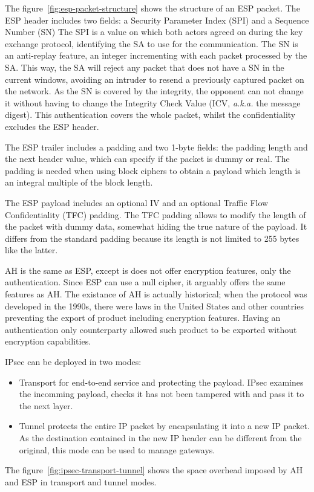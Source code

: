 The figure~\ref{fig:esp-packet-structure} shows the structure of an ESP packet.
The ESP header includes two fields: a Security Parameter Index (SPI) and a Sequence Number (SN)
The SPI is a value on which both actors agreed on during the key exchange protocol, identifying the SA to use for the communication.
The SN is an anti-replay feature, an integer incrementing with each packet processed by the SA. This way, the SA will reject any packet that does not have a SN in the current windows, avoiding an intruder to resend a previously captured packet on the network.
As the SN is covered by the integrity, the opponent can not change it without having to change the Integrity Check Value (ICV, \textit{a.k.a.} the message digest).
This authentication covers the whole packet, whilst the confidentiality excludes the ESP header.

\noindent The ESP trailer includes a padding and two 1-byte fields: the padding length and the next header value, which can specify if the packet is dummy or real.
The padding is needed when using block ciphers to obtain a payload which length is an integral multiple of the block length.

\noindent The ESP payload includes an optional IV and an optional Traffic Flow Confidentiality (TFC) padding.
The TFC padding allows to modify the length of the packet with dummy data, somewhat hiding the true nature of the payload.
It differs from the standard padding because its length is not limited to 255 bytes like the latter.

\noindent AH is the same as ESP, except is does not offer encryption features, only the authentication.
Since ESP can use a null cipher, it arguably offers the same features as AH.
The existance of AH is actually historical; when the protocol was developed in the 1990s, there were laws in the United States and other countries preventing the export of product including encryption features.
Having an authentication only counterparty allowed such product to be exported without encryption capabilities.\newline{}

IPsec can be deployed in two modes: 
\begin{itemize}
	\item Transport for end-to-end service and protecting the payload. IPsec examines the incomming payload, checks it has not been tampered with and pass it to the next layer.
	\item Tunnel protects the entire IP packet by encapsulating it into a new IP packet. As the destination contained in the new IP header can be different from the original, this mode can be used to manage gateways.
\end{itemize}
The figure~\ref{fig:ipsec-transport-tunnel} shows the space overhead imposed by AH and ESP in transport and tunnel modes.

